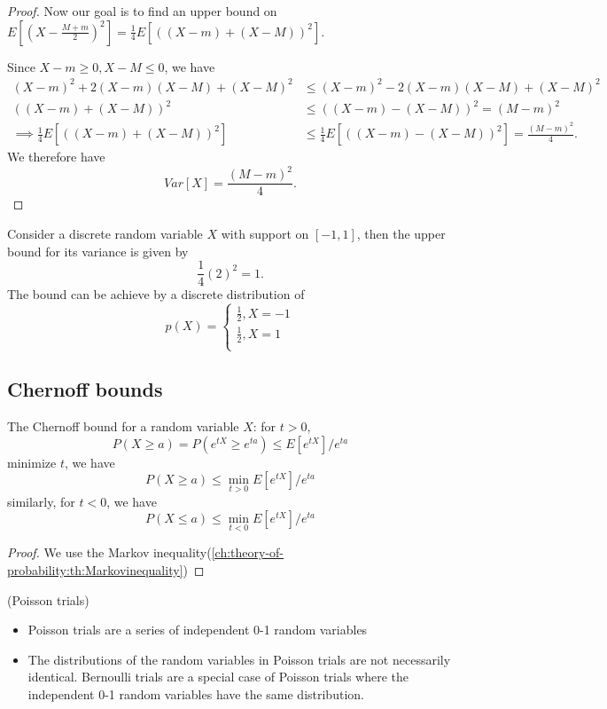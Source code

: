 \begin{refsection}
\begin{proof}
Now our goal is to find an upper bound on $E[(X - \frac{M+m}{2})^2] =\frac{1}{4} E[((X - m) + (X -M))^2]$. 

Since $X-m\geq 0, X-M\leq 0$, we have
\begin{align*}
(X-m)^2 + 2(X-m)(X-M) + (X-M)^2 &\leq (X-m)^2 - 2(X-m)(X-M) + (X-M)^2 \\
((X-m) + (X-M))^2 &\leq ((X-m) - (X-M))^2 = (M-m)^2 \\
\implies \frac{1}{4}E[((X - m) + (X -M))^2] &\leq \frac{1}{4}E[((X - m) - (X -M))^2] = \frac{(M-m)^2}{4}.
\end{align*}
We therefore have 
$$Var[X] = \frac{(M-m)^2}{4}.$$	
\end{proof}

\begin{example}
Consider a discrete random variable $X$ with support on $[-1,1]$, then the upper bound for its variance is given by $$\frac{1}{4}(2)^2 = 1.$$ 	
The bound  can be achieve by a discrete distribution of 
$$p(X) = \begin{cases*}
\frac{1}{2}, X = -1\\
\frac{1}{2}, X = 1\\
\end{cases*}$$
\end{example}



\subsection{Chernoff bounds}
\begin{theorem}
\cite{mitzenmacher2005probability}The Chernoff bound for a random variable $X$: for $t>0$, $$P(X\geq a) = P(e^{tX} \geq e^{ta}) \leq E[e^{tX}]/e^{ta}$$
minimize $t$, we have
$$P(X\geq a) \leq \min_{t>0}E[e^{tX}]/e^{ta}$$
similarly, for $t<0$, we have
$$P(X\leq a) \leq \min_{t<0}E[e^{tX}]/e^{ta}$$	
\end{theorem}
\begin{proof}
We use the Markov inequality(\autoref{ch:theory-of-probability:th:Markovinequality})
\end{proof}

\begin{remark} (Poisson trials)
\begin{itemize}
    \item Poisson trials are a series of independent 0-1 random variables
    \item The distributions of the random variables in Poisson trials are not necessarily identical. Bernoulli trials are a special case of Poisson trials where the independent 0-1 random variables have the same distribution.
\end{itemize}
\end{remark}





\end{refsection}
